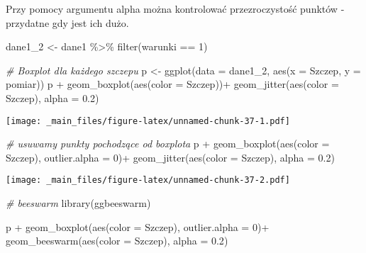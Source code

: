 \documentclass[
]{book}
\newenvironment{Shaded}{\begin{snugshade}}{\end{snugshade}}
\newcommand{\AttributeTok}[1]{\textcolor[rgb]{0.77,0.63,0.00}{#1}}
\newcommand{\CommentTok}[1]{\textcolor[rgb]{0.56,0.35,0.01}{\textit{#1}}}
\newcommand{\DecValTok}[1]{\textcolor[rgb]{0.00,0.00,0.81}{#1}}
\newcommand{\FloatTok}[1]{\textcolor[rgb]{0.00,0.00,0.81}{#1}}
\newcommand{\FunctionTok}[1]{\textcolor[rgb]{0.00,0.00,0.00}{#1}}
\newcommand{\NormalTok}[1]{#1}
\newcommand{\OtherTok}[1]{\textcolor[rgb]{0.56,0.35,0.01}{#1}}
\newcommand{\SpecialCharTok}[1]{\textcolor[rgb]{0.00,0.00,0.00}{#1}}
\begin{document}
Przy pomocy argumentu alpha można kontrolować przezroczystość punktów - przydatne gdy jest ich dużo.

\begin{Shaded}
\begin{Highlighting}[]
\NormalTok{dane1\_2 }\OtherTok{\textless{}{-}}\NormalTok{ dane1 }\SpecialCharTok{\%\textgreater{}\%} \FunctionTok{filter}\NormalTok{(warunki }\SpecialCharTok{==} \DecValTok{1}\NormalTok{)}

\CommentTok{\# Boxplot dla każdego szczepu}
\NormalTok{p }\OtherTok{\textless{}{-}} \FunctionTok{ggplot}\NormalTok{(}\AttributeTok{data =}\NormalTok{ dane1\_2, }\FunctionTok{aes}\NormalTok{(}\AttributeTok{x =}\NormalTok{ Szczep, }\AttributeTok{y =}\NormalTok{ pomiar))}
\NormalTok{p }\SpecialCharTok{+} \FunctionTok{geom\_boxplot}\NormalTok{(}\FunctionTok{aes}\NormalTok{(}\AttributeTok{color =}\NormalTok{ Szczep))}\SpecialCharTok{+}
  \FunctionTok{geom\_jitter}\NormalTok{(}\FunctionTok{aes}\NormalTok{(}\AttributeTok{color =}\NormalTok{ Szczep), }\AttributeTok{alpha =} \FloatTok{0.2}\NormalTok{)}
\end{Highlighting}
\end{Shaded}

\texttt{[image: \_main\_files/figure-latex/unnamed-chunk-37-1.pdf]}

\begin{Shaded}
\begin{Highlighting}[]
\CommentTok{\# usuwamy punkty pochodzące od boxplota}
\NormalTok{p }\SpecialCharTok{+} \FunctionTok{geom\_boxplot}\NormalTok{(}\FunctionTok{aes}\NormalTok{(}\AttributeTok{color =}\NormalTok{ Szczep), }\AttributeTok{outlier.alpha =} \DecValTok{0}\NormalTok{)}\SpecialCharTok{+}
  \FunctionTok{geom\_jitter}\NormalTok{(}\FunctionTok{aes}\NormalTok{(}\AttributeTok{color =}\NormalTok{ Szczep), }\AttributeTok{alpha =} \FloatTok{0.2}\NormalTok{)}
\end{Highlighting}
\end{Shaded}

\texttt{[image: \_main\_files/figure-latex/unnamed-chunk-37-2.pdf]}

\begin{Shaded}
\begin{Highlighting}[]
\CommentTok{\# beeswarm}
\FunctionTok{library}\NormalTok{(ggbeeswarm)}

\NormalTok{p }\SpecialCharTok{+} \FunctionTok{geom\_boxplot}\NormalTok{(}\FunctionTok{aes}\NormalTok{(}\AttributeTok{color =}\NormalTok{ Szczep), }\AttributeTok{outlier.alpha =} \DecValTok{0}\NormalTok{)}\SpecialCharTok{+}
  \FunctionTok{geom\_beeswarm}\NormalTok{(}\FunctionTok{aes}\NormalTok{(}\AttributeTok{color =}\NormalTok{ Szczep), }\AttributeTok{alpha =} \FloatTok{0.2}\NormalTok{)}
\end{Highlighting}
\end{Shaded}
\end{document}
